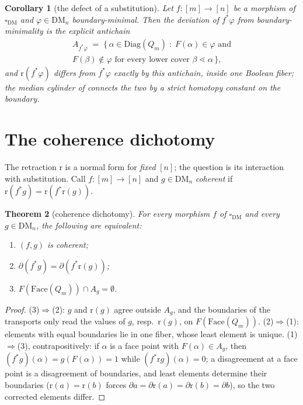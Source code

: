 \documentclass[11pt]{amsart}
\newtheorem{thm}{Theorem}[section]
\newtheorem{cor}[thm]{Corollary}
\theoremstyle{definition}
\newcommand{\DM}{\mathrm{DM}}
\newcommand{\cube}{\square_{\mathrm{DM}}}
\newcommand{\lc}{Q}
\newcommand{\bnd}{\partial}
\newcommand{\Face}{\mathrm{Face}}
\newcommand{\Diag}{\mathrm{Diag}}
\newcommand{\rmin}{\mathrm{r}}
\begin{document}
\begin{cor}[the defect of a substitution]
  \label{cor:defect}
  Let $f : [m] \to [n]$ be a morphism of $\cube$ and
  $\varphi \in \DM_n$ boundary-minimal.  Then the deviation of
  $f^{*}\varphi$ from boundary-minimality is the explicit antichain
  \begin{multline*}
    A_{f^{*}\varphi} \;=\;
    \{\, \alpha \in \Diag(\lc_m) \;:\;
    F(\alpha) \in \varphi \text{ and}\\
    F(\beta) \notin \varphi
    \text{ for every lower cover } \beta \lessdot \alpha \,\},
  \end{multline*}
  and $\rmin(f^{*}\varphi)$ differs from $f^{*}\varphi$ exactly by
  this antichain, inside one Boolean fiber; the median cylinder of
  \cite{DMFibers} connects the two by a strict homotopy constant on
  the boundary.
\end{cor}

\section{The coherence dichotomy}
\label{sec:coherence}

The retraction $\rmin$ is a normal form for \emph{fixed} $[n]$; the
question is its interaction with substitution.  Call
$f : [m] \to [n]$ and $g \in \DM_n$ \emph{coherent} if
$\rmin(f^{*}g) = \rmin(f^{*}\rmin(g))$.

\begin{thm}[coherence dichotomy]
  \label{thm:dichotomy}
  For every morphism $f$ of $\cube$ and every $g \in \DM_n$, the
  following are equivalent:
  \begin{enumerate}
  \item $(f, g)$ is coherent;
  \item $\bnd(f^{*}g) = \bnd(f^{*}\rmin(g))$;
  \item $F(\Face(\lc_m)) \cap A_g = \emptyset$.
  \end{enumerate}
\end{thm}

\begin{proof}
  (3)$\Rightarrow$(2): $g$ and $\rmin(g)$ agree outside $A_g$, and
  the boundaries of the transports only read the values of $g$,
  resp.\ $\rmin(g)$, on $F(\Face(\lc_m))$.
  (2)$\Rightarrow$(1): elements with equal boundaries lie in one
  fiber, whose least element is unique.
  (1)$\Rightarrow$(3), contrapositively: if $\alpha$ is a face point
  with $F(\alpha) \in A_g$, then
  $(f^{*}g)(\alpha) = g(F(\alpha)) = 1$ while
  $(f^{*}\rmin g)(\alpha) = 0$; a disagreement at a face point is a
  disagreement of boundaries, and least elements determine their
  boundaries ($\rmin(a) = \rmin(b)$ forces
  $\bnd a = \bnd \rmin(a) = \bnd \rmin(b) = \bnd b$), so the two
  corrected elements differ.
\end{proof}
\end{document}
